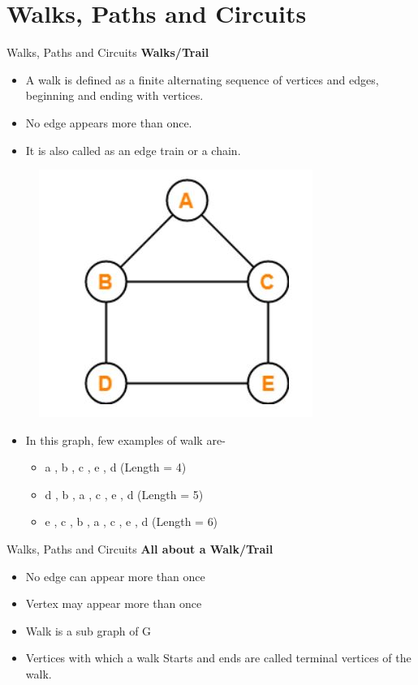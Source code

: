 \documentclass{beamer}
\begin{document}
\section{Walks, Paths and Circuits}
\begin{frame}{Walks, Paths and Circuits}
	\textbf{Walks/Trail}
	\begin{itemize}
		\item A walk is defined as a finite alternating sequence of vertices and edges, beginning 
		and ending with vertices. 
		\item No edge appears more than once.
		\item It is also called as an edge train 
		or a chain.
	\end{itemize}
\begin{figure}
	\includegraphics[scale=.4]{img/m25}
\end{figure}
\begin{itemize}
	\item In this graph, few examples of walk are-
	\begin{itemize}
		\item a , b , c , e , d (Length = 4)
		\item d , b , a , c , e , d (Length = 5)
		\item e , c , b , a , c , e , d (Length = 6)
	\end{itemize}
\end{itemize}
\end{frame}
\begin{frame}{Walks, Paths and Circuits}
	\textbf{All about a  Walk/Trail}
	\begin{itemize}
		\item No edge can appear more than once
		\item Vertex may appear more than once
		\item Walk is a sub graph of G
		\item Vertices with which a walk Starts and ends are called terminal vertices of the walk.
	\end{itemize}
\end{frame}
\end{document}
